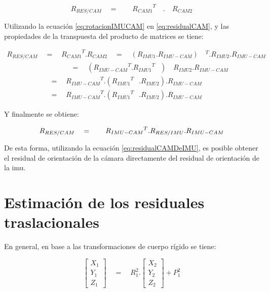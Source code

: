 \begin{equation}
{ R }_{ RES/CAM }\quad =\quad \quad { { R }_{ CAM1 } }^{ T }\quad .\quad { R }_{ CAM2 }
\label{eq:residualCAM} 
\end{equation}

Utilizando la ecuación \ref{eq:rotacionIMUCAM} en \ref{eq:residualCAM}, y las propiedades de la transpuesta del producto de matrices se tiene:

\begin{align}
{ R }_{ RES/CAM }\quad =\quad { { R }_{ CAM1 } }^{ T }.{ R }_{ CAM2 }\quad =\quad ({ R }_{ IMU1 }.{ R }_{ IMU-CAM })\quad ^{ T }.{ R }_{ IMU2 }.{ R }_{ IMU-CAM }\\ \quad \quad \quad \quad \quad \quad \quad \quad \quad =\quad ({ { R }_{ IMU-CAM } }^{ T }.{ { R }_{ IMU1 } }^{ T\quad  })\quad { R }_{ IMU2 }.{ R }_{ IMU-CAM }\\ \qquad \qquad \qquad ={ { \quad R }_{ IMU-CAM } }^{ T }.({ { R }_{ IMU1 } }^{ T\quad  }.{ R }_{ IMU2 }).{ R }_{ IMU-CAM }\\ \qquad \qquad \qquad =\quad { { R }_{ IMU-CAM } }^{ T }.({ { R }_{ IMU1 } }^{ T\quad  }.{ R }_{ IMU2 }).{ R }_{ IMU-CAM }
\label{eq:residualCAMProcedimiento} 
\end{align}

Y finalmente se obtiene:

\begin{equation}
{ R }_{ RES/CAM }\quad =\quad { { \quad R }_{ IMU-CAM } }^{ T }. { R }_{ RES/IMU } . { R }_{ IMU-CAM\\  }
\label{eq:residualCAMDeIMU} 
\end{equation}

De esta forma, utilizando la ecuación \ref{eq:residualCAMDeIMU}, es posible obtener el residual de orientación de la cámara directamente del residual de orientación de la imu.


\section{Estimación de los residuales traslacionales}


En general, en base a las transformaciones de cuerpo rígido se tiene:

\begin{equation}
\left[ \begin{matrix} { X }_{ 1 } \\ { Y }_{ 1 } \\ { Z }_{ 1 } \end{matrix} \right] \quad =\quad { R }_{ 1 }^{ 2 }.\left[ \begin{matrix} { X }_{ 2 } \\ { Y }_{ 2 } \\ { Z }_{ 2 } \end{matrix} \right] +{ P }_{ 1 }^{ 2 } 
\label{eq:TransformacionCAM1CAM2} 
\end{equation}


